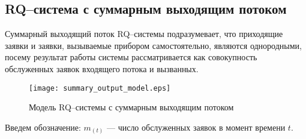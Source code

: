 \subsection{RQ--система с суммарным выходящим потоком} \label{section_simple_summary}
Суммарный выходящий поток RQ--системы подразумевает, что приходящие заявки и заявки, вызываемые прибором самостоятельно, являются однородными, посему результат работы системы рассматривается как совокупность обслуженных заявок входящего потока и вызванных. 
\begin{figure}[H]
	\centering
	\texttt{[image: summary\_output\_model.eps]}
	\caption{Модель RQ--системы с суммарным выходящим потоком}
	\label{summary_output_model_fig}
\end{figure}
Введем обозначение: $m_(t)$ --- число обслуженных заявок в момент времени $t$.


